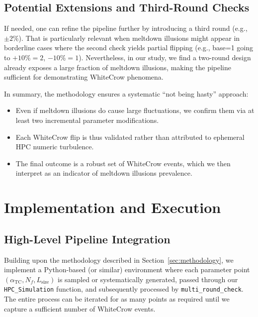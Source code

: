 \documentclass[11pt]{article}
\begin{document}
\subsection{Potential Extensions and Third-Round Checks}

If needed, one can refine the pipeline further by introducing
a third round (e.g., $\pm 2\%$). That is particularly relevant
when meltdown illusions might appear in borderline cases 
where the second check yields partial flipping 
(e.g., base=1 going to $+10\%=2$, $-10\%=1$). 
Nevertheless, in our study, we find a two-round design 
already exposes a large fraction of meltdown illusions,
making the pipeline sufficient for demonstrating WhiteCrow phenomena.

In summary, the methodology ensures a systematic 
``not being hasty'' approach:
\begin{itemize}
\item Even if meltdown illusions do cause large fluctuations,
      we confirm them via at least two incremental parameter modifications.
\item Each WhiteCrow flip is thus validated rather than attributed 
      to ephemeral HPC numeric turbulence.
\item The final outcome is a robust set of WhiteCrow events, 
      which we then interpret as an indicator of meltdown illusions prevalence.
\end{itemize}

\section{Implementation and Execution}
\label{sec:implementation}

\subsection{High-Level Pipeline Integration}

Building upon the methodology described in Section~\ref{sec:methodology},
we implement a Python-based (or similar) environment where each parameter point
$(\alpha_{\mathrm{TC}}, N_f, L_{\mathrm{size}})$ is sampled or systematically generated,
passed through our \texttt{HPC\_Simulation} function, and subsequently processed
by \texttt{multi\_round\_check}. The entire process can be iterated 
for as many points as required until we capture a sufficient number of WhiteCrow events.
\end{document}
